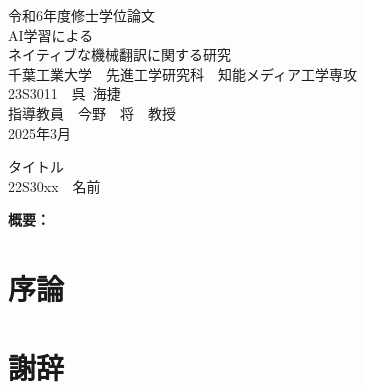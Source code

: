 \documentclass[12pt,a4paper]{ujreport}
\newenvironment{longbox}{%
  \def\FrameCommand{\fboxsep=\FrameSep \fbox}%
  \MakeFramed {\FrameRestore}}%
 {\endMakeFramed}
\begin{document}
%
%
\begin{titlepage}
\begin{center}
{\large 令和6年度修士学位論文\\}
 \vspace{3cm}
 {\Huge AI学習による\\
\vspace{5mm}ネイティブな機械翻訳に関する研究\\}
\vspace{4cm}
{\large%
  千葉工業大学~~先進工学研究科~~知能メディア工学専攻\\
\vspace{3mm}23S3011~~呉~海捷\\
\vspace{3cm}指導教員~~今野~~将~~教授\\
\vspace{1cm}2025年3月\\
}
\end{center}
\end{titlepage}

\begin{titlepage}
\begin{longbox}
\begin{center}
 {\Huge タイトル}\\
 {\large%
   \vspace{3mm}%
   22S30xx~~名前\\
 }
\end{center}
{\bf 概要：}%




\end{longbox}
\end{titlepage}




\newpage
\tableofcontents

\newpage
\setcounter{page}{0}
\chapter{序論}

\chapter*{謝辞}
\nocite{*}
\end{document}
